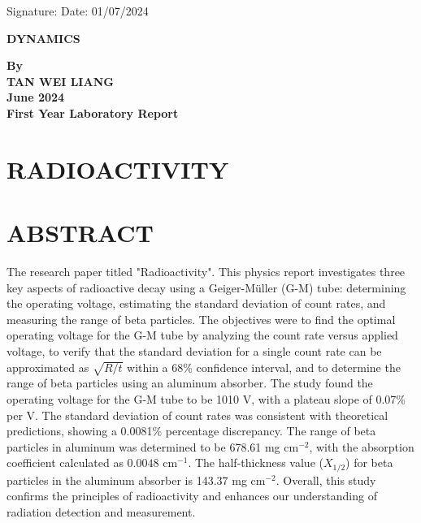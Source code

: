 \documentclass[a4paper,11pt]{article}
\begin{document}
Signature: \hrulefill \hfill Date: 01/07/2024

\newpage
\begin{center}
\vspace*{1cm}
\textbf{\Large DYNAMICS}

\vspace{3.0cm}
\textbf{By}\\

\vspace{3.0cm}
\textbf{TAN WEI LIANG} \\

\vspace{3.0cm}
\textbf{June 2024}\\

\vfill
\textbf{\large First Year Laboratory Report}
\end{center}


\newpage
{}
\section*{\large \center RADIOACTIVITY}
\section*{\large \center ABSTRACT}
\label{sec:ABSTRACT}
The research paper titled "Radioactivity". This physics report investigates three key aspects of radioactive decay using a Geiger-Müller (G-M) tube: determining the operating voltage, estimating the standard deviation of count rates, and measuring the range of beta particles. The objectives were to find the optimal operating voltage for the G-M tube by analyzing the count rate versus applied voltage, to verify that the standard deviation for a single count rate can be approximated as $\sqrt{R/t}$ within a 68\% confidence interval, and to determine the range of beta particles using an aluminum absorber. The study found the operating voltage for the G-M tube to be 1010 V, with a plateau slope of 0.07\% per V. The standard deviation of count rates was consistent with theoretical predictions, showing a 0.0081\% percentage discrepancy. The range of beta particles in aluminum was determined to be 678.61 mg cm$^{-2}$, with the absorption coefficient calculated as $0.0048 \text{ cm}^{-1}$. The half-thickness value (\( X_{1/2} \)) for beta particles in the aluminum absorber is 143.37 mg cm\(^{-2}\). Overall, this study confirms the principles of radioactivity and enhances our understanding of radiation detection and measurement.
\end{document}
